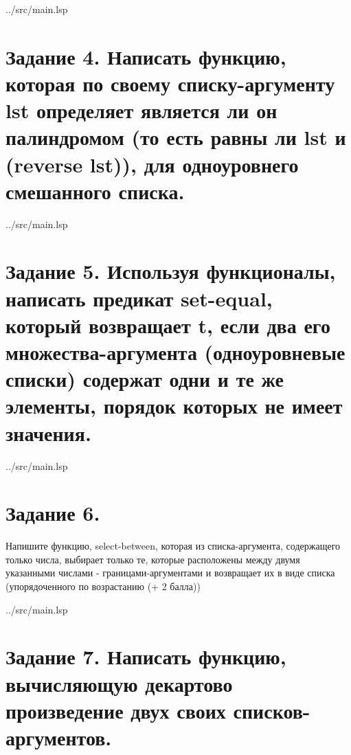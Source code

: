 \clearpage

\begin{lstinputlisting}[
	caption={Задание 3, b, mapcar, mapcon},
	label={lst:t3-2},
	style={lsp},
	linerange={44-60},
	]{../src/main.lsp}
\end{lstinputlisting}


\section*{Задание 4. Написать функцию, которая по своему списку-аргументу lst определяет является ли он палиндромом (то есть равны ли lst и (reverse lst)), для одноуровнего смешанного списка. }


\begin{lstinputlisting}[
	caption={Задание 4},
	label={lst:t4},
	style={lsp},
	linerange={62-71},
	]{../src/main.lsp}
\end{lstinputlisting}

\section*{Задание 5. Используя функционалы, написать предикат set-equal, который возвращает t, если два его множества-аргумента (одноуровневые списки) содержат одни и те же элементы, порядок которых не имеет значения.}

\begin{lstinputlisting}[
	caption={Задание 5},
	label={lst:t5},
	style={lsp},
	linerange={73-81},
	]{../src/main.lsp}
\end{lstinputlisting}

\section*{Задание 6. }
Напишите функцию, select-between, которая из списка-аргумента, содержащего только
числа, выбирает только те, которые расположены между двумя указанными числами - 
границами-аргументами и возвращает их в виде списка (упорядоченного по 
возрастанию  (+ 2 балла))	

\begin{lstinputlisting}[
	caption={Задание 6},
	label={lst:t6},
	style={lsp},
	linerange={83-93},
	]{../src/main.lsp}
\end{lstinputlisting}

\section*{Задание 7. Написать функцию, вычисляющую декартово произведение двух своих списков-аргументов.}


